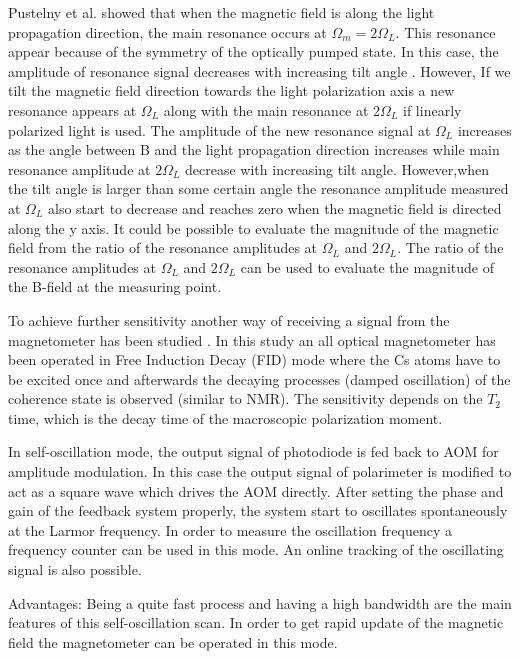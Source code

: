 Pustelny et al. \cite{PhysRevA.74.063420}  showed that when the magnetic field is along the light propagation direction, the main resonance occurs at $\Omega_m = 2\Omega_L$. This resonance appear because of the symmetry of the optically pumped state.  In this case, the amplitude of resonance signal decreases with increasing tilt angle . However, If we tilt the magnetic field direction towards the light polarization axis a new resonance appears at $\Omega_L$ along with the main resonance at $2\Omega_L$ if linearly polarized light is used. The amplitude of the new resonance signal at $\Omega_L$  increases as the angle between B and the light propagation direction increases while main resonance amplitude at $2\Omega_L$  decrease with increasing tilt angle. However,when the tilt angle is larger than some certain angle the resonance amplitude measured at $\Omega_L$ also start to decrease and reaches zero when the magnetic field is directed along the y axis.   It could be possible to evaluate the magnitude of the magnetic field from the ratio of the resonance amplitudes at $\Omega_L$ and $2\Omega_L$. The ratio of the resonance amplitudes at $\Omega_L$ and $2\Omega_L$ can be used to
evaluate the magnitude of the B-field at the measuring point.

 To achieve further sensitivity another way of receiving a signal from the magnetometer
has been studied \cite{mythesis}. In this study an all optical magnetometer has been operated in Free Induction Decay (FID) mode where the Cs atoms have to be excited
once and afterwards the decaying processes (damped oscillation) of the coherence state is
observed (similar to NMR). The sensitivity depends on the $T_2$ time, which is the decay time
of the macroscopic polarization moment.

In self-oscillation mode\cite{PhysRevA.62.043403}, the output signal
of photodiode is fed back to AOM for amplitude modulation. In this
case the output signal of polarimeter is modified to act as a square
wave which drives the AOM directly. After setting the phase and gain
of the feedback system properly, the system start to oscillates
spontaneously at the Larmor frequency. In order to measure the
oscillation frequency a frequency counter can be used in this mode. An
online tracking of the oscillating signal is also possible.

Advantages: Being a quite fast process and having a high bandwidth are
the main features of this self-oscillation scan. In order to get rapid
update of the magnetic field the magnetometer can be operated in this
mode.

